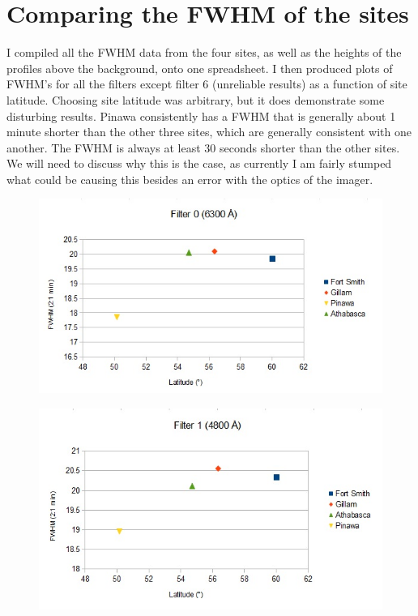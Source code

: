 \documentclass[11pt]{article}
\begin{document}
\section{Comparing the FWHM of the sites}

I compiled all the FWHM data from the four sites, as well as the heights of the profiles above the background, onto one spreadsheet. I then produced plots of FWHM's for all the filters except filter 6 (unreliable results) as a function of site latitude. Choosing site latitude was arbitrary, but it does demonstrate some disturbing results.  Pinawa consistently has a FWHM that is generally about 1 minute shorter than the other three sites, which are generally consistent with one another. The FWHM is always at least 30 seconds shorter than the other sites. We will need to discuss why this is the case, as currently I am fairly stumped what could be causing this besides an error with the optics of the imager. 

\begin{figure}[h!]
\includegraphics[scale=1.0]{filter0_FWHM.jpg}
\end{figure}

\begin{figure}[h!]
\includegraphics[scale=1.0]{filter1_FWHM.jpg}
\end{figure}
\end{document}
